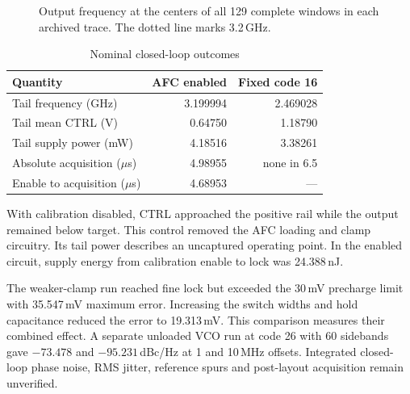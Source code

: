 \documentclass[10pt,conference,letterpaper]{IEEEtran}
\begin{document}
\begin{figure}[!t]\centering{}
\caption{Output frequency at the centers of all 129 complete windows in each archived trace. The dotted line marks 3.2\,GHz.}\label{fig:freq}\end{figure}
\begin{table}[!t]\centering\caption{Nominal closed-loop outcomes}
\begin{tabular}{lrr}\toprule
Quantity & AFC enabled & Fixed code 16\\\midrule
Tail frequency (GHz)&3.199994&2.469028\\
Tail mean CTRL (V)&0.64750&1.18790\\
Tail supply power (mW)&4.18516&3.38261\\
Absolute acquisition ($\mu$s)&4.98955&none in 6.5\\
Enable to acquisition ($\mu$s)&4.68953&---\\\bottomrule
\end{tabular}\end{table}
With calibration disabled, CTRL approached the positive rail while the output remained below target. This control removed the AFC loading and clamp circuitry. Its tail power describes an uncaptured operating point. In the enabled circuit, supply energy from calibration enable to lock was 24.388\,nJ.

The weaker-clamp run reached fine lock but exceeded the 30\,mV precharge limit with 35.547\,mV maximum error. Increasing the switch widths and hold capacitance reduced the error to 19.313\,mV. This comparison measures their combined effect. A separate unloaded VCO run at code 26 with 60 sidebands gave $-73.478$ and $-95.231$\,dBc/Hz at 1 and 10\,MHz offsets. Integrated closed-loop phase noise, RMS jitter, reference spurs and post-layout acquisition remain unverified.
\end{document}
